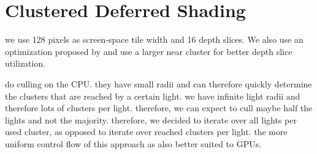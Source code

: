 \section{Clustered Deferred Shading}
\label{sec:impl:clusteredShading}

\begin{outline}
\1 we use 128 pixels as screen-space tile width and 16 depth slices. We also use an optimization proposed by \citet{persson::2013::practical} and use a larger near cluster for better depth slice utilization.

\1 \citet{persson::2013::practical} do culling on the CPU. they have small radii and can therefore quickly determine the clusters that are reached by a certain light.
\1 we have infinite light radii and therefore lots of clusters per light. therefore, we can expect to cull maybe half the lights and not the majority.
\1 therefore, we decided to iterate over all lights per used cluster, as opposed to iterate over reached clusters per light.
\1 the more uniform control flow of this approach as also better suited to GPUs.



\end{outline}
